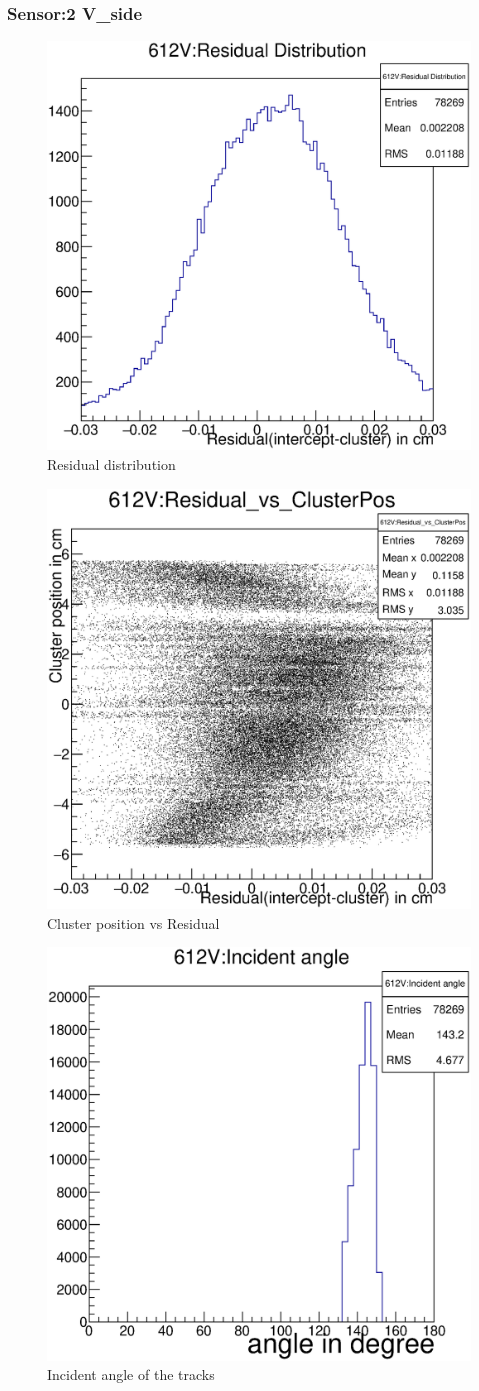 \documentclass[12pt]{article}
\begin{document}
	\pagebreak
	\subsubsection{Sensor:2 V\_side}
	\begin{multicols}{3}
		\begin{figure}[H]
			\includegraphics[width=.3\textwidth]{612V:residualplot.eps}	
			\caption{Residual distribution}	
			\label{fig1}	
		\end{figure}
		\begin{figure}[H]
			\includegraphics[width=.3\textwidth]{612V:residual_vs_clusterpos.eps}	
			\caption{Cluster position vs Residual}	
			\label{fig2}	
		\end{figure}
		\begin{figure}[H]
			\includegraphics[width=.3\textwidth]{612V:incident_angle.eps}	
			\caption{Incident angle of the tracks}	
			\label{fig2}	
		\end{figure}
	\end{multicols}
	
\end{document}
